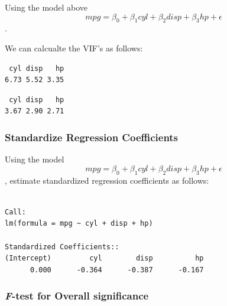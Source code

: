 \documentclass[]{book}
\newenvironment{Shaded}{\begin{snugshade}}{\end{snugshade}}
\newcommand{\KeywordTok}[1]{\textcolor[rgb]{0.13,0.29,0.53}{\textbf{#1}}}
\newcommand{\NormalTok}[1]{#1}
\newcommand{\OperatorTok}[1]{\textcolor[rgb]{0.81,0.36,0.00}{\textbf{#1}}}
\newcommand{\StringTok}[1]{\textcolor[rgb]{0.31,0.60,0.02}{#1}}
\begin{document}
Using the model above \[mpg=\beta_0+\beta_1cyl+\beta_2disp+\beta_3hp+\epsilon\].

We can calcualte the VIF's as follows:

\begin{Shaded}
\end{Shaded}

\begin{verbatim}
 cyl disp   hp 
6.73 5.52 3.35 
\end{verbatim}

\begin{Shaded}
\end{Shaded}

\begin{verbatim}
 cyl disp   hp 
3.67 2.90 2.71 
\end{verbatim}

\hypertarget{standardize-regression-coefficients}{%
\subsubsection{Standardize Regression Coefficients}\label{standardize-regression-coefficients}}

Using the model \[mpg=\beta_0+\beta_1cyl+\beta_2disp+\beta_3hp+\epsilon\], estimate standardized regression coefficients as follows:

\begin{Shaded}
\end{Shaded}

\begin{verbatim}

Call:
lm(formula = mpg ~ cyl + disp + hp)

Standardized Coefficients::
(Intercept)         cyl        disp          hp 
      0.000      -0.364      -0.387      -0.167 
\end{verbatim}

\hypertarget{f-test-for-overall-significance}{%
\subsubsection{\texorpdfstring{\emph{F}-test for Overall significance}{F-test for Overall significance}}\label{f-test-for-overall-significance}}
\end{document}
